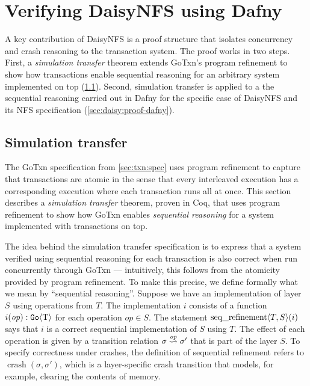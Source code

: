\section{Verifying DaisyNFS using Dafny}
\label{sec:daisy:proof}

A key contribution of DaisyNFS is a proof structure that isolates concurrency and crash
reasoning to the transaction system. The proof works in two steps. First, a
\emph{simulation transfer} theorem extends GoTxn's program refinement to show
how transactions enable sequential reasoning for an arbitrary system implemented on
top (\cref{sec:daisy:simulation-transfer}). Second, simulation transfer is
applied to a the sequential reasoning carried out in Dafny for the specific case
of DaisyNFS and its NFS specification (\cref{sec:daisy:proof-dafny}).

\subsection{Simulation transfer}%
\label{sec:daisy:simulation-transfer}

The GoTxn specification from \cref{sec:txn:spec} uses program refinement to
capture that transactions are atomic in the sense that every interleaved
execution has a corresponding execution where each transaction runs all at once.
This section describes a \emph{simulation transfer} theorem, proven in Coq, that
uses program refinement to show how GoTxn enables \emph{sequential
reasoning} for a system implemented with transactions on top.

The idea behind the simulation transfer specification is to express that a system
verified using sequential reasoning for each transaction is also correct when
run concurrently through GoTxn --- intuitively, this follows from the atomicity
provided by program refinement.
To make this precise, we define formally what we mean by
``sequential reasoning''. Suppose we have an
implementation of layer $S$ using operations from $T$. The implementation $i$
consists of a function $i(\mathit{op}) : \mathtt{Go}\langle \mathrm{T} \rangle$ for each operation $op \in S$. The statement
$\operatorname{seq\_refinement} \langle T, S \rangle(i)$ says that $i$ is a correct sequential
implementation of $S$ using $T$. The effect of each operation is given by a
transition relation $\sigma \overset{\mathit{op}}{\leadsto} \sigma'$ that is part of the layer
$S$. To specify correctness under crashes, the
definition of sequential refinement refers to $\operatorname{crash}(\sigma, \sigma')$, which is a
layer-specific crash transition that models, for example, clearing the
contents of memory.

